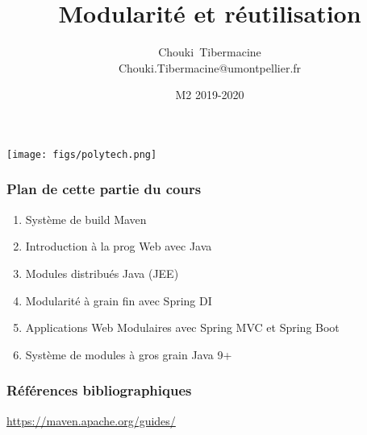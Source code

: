 \documentclass{beamer}
\title[M\&R]{\Large{Modularité et réutilisation}}
\author[C. Tibermacine]{\large{Chouki~Tibermacine}\\
\small{Chouki.Tibermacine@umontpellier.fr}}
\date{\tiny{M2 2019-2020}}
\begin{document}
\begin{frame}
\titlepage
\begin{flushright}
\texttt{[image: figs/polytech.png]}
\end{flushright}
\end{frame}

\begin{frame}
  \frametitle{Plan de cette partie du cours}
\begin{enumerate}
\item Système de build Maven
\item Introduction à la prog Web avec Java
\item Modules distribués Java (JEE)
\item Modularité à grain fin avec Spring DI
\item Applications Web Modulaires avec Spring MVC et Spring Boot
\item Système de modules à gros grain Java 9+
\end{enumerate}
\end{frame}

\begin{frame}
  \frametitle{Références bibliographiques}
  \begin{flushright}
    \vspace{4.8cm}
   {\footnotesize \url{https://maven.apache.org/guides/}}
  \end{flushright}    
\end{frame}


\end{document}
